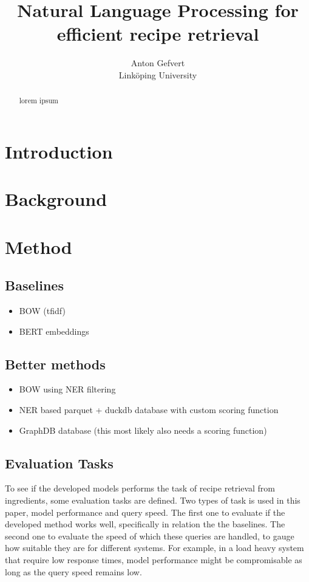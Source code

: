 \documentclass[11pt]{article}
\title{Natural Language Processing for efficient recipe retrieval}
\date{}
\author{Anton Gefvert \\ Linköping University}
\begin{document}
\maketitle
\begin{abstract}
    lorem ipsum
\end{abstract}

\section{Introduction}

\section{Background}

\section{Method}
\subsection{Baselines}
\begin{itemize}
    \item BOW (tfidf)
    \item BERT embeddings
\end{itemize}

\subsection{Better methods}
\begin{itemize}
    \item BOW using NER filtering
    \item NER based parquet + duckdb database with custom scoring function
    \item GraphDB database (this most likely also needs a scoring function)
\end{itemize}

\subsection{Evaluation Tasks}
To see if the developed models performs the task of recipe retrieval from
ingredients, some evaluation tasks are defined.
Two types of task is used in this paper, model performance and query speed.
The first one to evaluate if the developed method works well, specifically in
relation the the baselines.
The second one to evaluate the speed of which these queries are handled, to
gauge how suitable they are for different systems.
For example, in a load heavy system that require low response times, model
performance might be compromisable as long as the query speed remains low.
\end{document}
